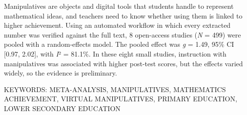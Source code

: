 \documentclass[
  lualatex, ja=standard, paper={182mm,257mm}, twocolumn, fontsize=8.5pt, baselineskip=13.5pt,
  line_length=24zw, column_gap=6.1mm, number_of_lines=45, head_space=24.5mm, gutter=16.25mm
]{jlreq}
\newcommand{\chapspaced}[1]{\par\vspace{13.5pt}\needspace{4\baselineskip}{\centering\gtfamily\bfseries #1\par}\nopagebreak}
\begin{document}
\chapspaced{Summary}
{\setlength{\parindent}{1\zw}\noindent Manipulatives are objects and digital tools that students handle to represent mathematical ideas, and teachers need to know whether using them is linked to higher achievement. Using an automated workflow in which every extracted number was verified against the full text, 8 open-access studies (\textit{N} = 499) were pooled with a random-effects model. The pooled effect was \textit{g} = 1.49, 95\% CI [0.97, 2.02], with \textit{I}² = 81.1\%. In these eight small studies, instruction with manipulatives was associated with higher post-test scores, but the effects varied widely, so the evidence is preliminary.\par
KEYWORDS: META-ANALYSIS, MANIPULATIVES, MATHEMATICS ACHIEVEMENT, VIRTUAL MANIPULATIVES, PRIMARY EDUCATION, LOWER SECONDARY EDUCATION\par}
\end{document}
